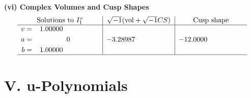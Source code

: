 \documentclass[1p]{elsarticle_modified}
\theoremstyle{definition}
\newcommand{\I}{\sqrt{-1}}
\begin{document}
\newpage\flushleft \textbf{(vi) Complex Volumes and Cusp Shapes}
$$\begin{array}{c|c|c}  
\text{Solutions to }I^v_{1}& \I (\text{vol} + \sqrt{-1}CS) & \text{Cusp shape}\\
 \hline 
\begin{aligned}
v &= \phantom{-}1.00000\phantom{ +0.000000I} \\
a &= \phantom{-0.000000 } 0 \\
b &= \phantom{-}1.00000\phantom{ +0.000000I}\end{aligned}
 & -3.28987\phantom{ +0.000000I} & -12.0000\phantom{ +0.000000I}\\
 \hline 
 \end{array}$$\newpage
\newpage\renewcommand{\arraystretch}{1}
\centering \section*{ V. u-Polynomials}
\end{document}
